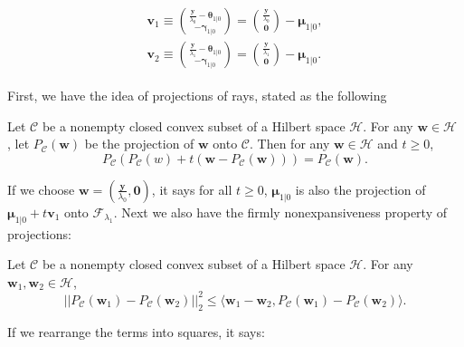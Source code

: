 \begin{gather}
    \label{eq:1.2.1}
    \begin{aligned}
        \boldsymbol v_1\equiv\binom{\frac{\boldsymbol y}{\lambda_0}-\boldsymbol \theta_{1|0}}{-\boldsymbol \gamma_{1|0}}=\binom{\frac{\boldsymbol y}{\lambda_0}}{\boldsymbol0}-\boldsymbol\mu_{1|0},\\
        \boldsymbol v_2\equiv \binom{\frac{\boldsymbol y}{\lambda_1}-\boldsymbol \theta_{1|0}}{-\boldsymbol \gamma_{1|0}}=\binom{\frac{\boldsymbol y}{\lambda_1}}{\boldsymbol0}-\boldsymbol\mu_{1|0}.
    \end{aligned}
\end{gather}

First, we have the idea of projections of rays, stated as the following

\begin{lemma}
    \citep{Bauschke2011}
    Let $\mathcal{C}$ be a nonempty closed convex subset of a Hilbert space $\mathcal{H}$. For any $\boldsymbol w\in\mathcal{H}$ , let $P_{\mathcal{C}}(\boldsymbol w)$ be the projection of $\boldsymbol w$ onto $\mathcal{C}$. Then for any $\boldsymbol w\in\mathcal{H}$ and $t\geq 0$,
    \begin{equation}
        P_{\mathcal{C}}\left(P_{\mathcal{C}}(w)+t\left(\boldsymbol w-P_{\mathcal{C}}(\boldsymbol w)\right)\right)=P_{\mathcal{C}}(\boldsymbol w).
    \end{equation}
\end{lemma}

If we choose $\boldsymbol w=(\frac{\boldsymbol y}{\lambda_0},\boldsymbol0)$, it says for all $t\geq 0$, $\boldsymbol\mu_{1|0}$ is also the projection of $\boldsymbol\mu_{1|0}+t\boldsymbol v_1$ onto $\mathcal{F}_{\lambda_1}$. Next we also have the firmly nonexpansiveness property of projections:

\begin{lemma}
    \citep{Bauschke2011}
    Let $\mathcal{C}$ be a nonempty closed convex subset of a Hilbert space $\mathcal{H}$. For any $\boldsymbol w_1,\boldsymbol w_2\in\mathcal{H}$,
    \begin{equation}
        ||P_{\mathcal{C}}(\boldsymbol w_1)-P_{\mathcal{C}}(\boldsymbol w_2)||_2^2\leq \langle\boldsymbol w_1-\boldsymbol w_2, P_{\mathcal{C}}(\boldsymbol w_1)-P_{\mathcal{C}}(\boldsymbol w_2)\rangle.
    \end{equation}
\end{lemma}

If we rearrange the terms into squares, it says:

